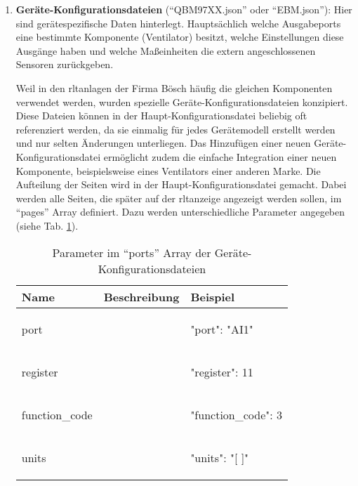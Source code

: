 \begin{enumerate}
	\item \textbf{Geräte-Konfigurationsdateien} (\zB \enquote{QBM97XX.json} oder \enquote{EBM.json}): Hier sind gerätespezifische Daten hinterlegt. Hauptsächlich welche Ausgabeports eine bestimmte Komponente (\zB Ventilator) besitzt, welche Einstellungen diese Ausgänge haben und \ggf welche Maßeinheiten die extern angeschlossenen Sensoren zurückgeben. 
	
	Weil in den \acs{rltanlagen} der Firma Bösch häufig die gleichen Komponenten verwendet werden, wurden spezielle Geräte-Konfigurationsdateien konzipiert. Diese Dateien können in der Haupt-Konfigurationsdatei beliebig oft referenziert werden, da sie einmalig für jedes Gerätemodell erstellt werden und nur selten Änderungen unterliegen. Das Hinzufügen einer neuen Geräte-Konfigurationsdatei ermöglicht zudem die einfache Integration einer neuen Komponente, beispielsweise eines Ventilators einer anderen Marke.
	Die Aufteilung der Seiten wird in der Haupt-Konfigurationsdatei gemacht. Dabei werden alle Seiten, die später auf der \acs{rltanzeige} angezeigt werden sollen, im \enquote{pages} Array definiert. Dazu werden unterschiedliche Parameter angegeben (siehe Tab. \ref{tab:pages_array_parameter}).

	
	\begin{table}[H]
		\caption{Parameter im \enquote{ports} Array der Geräte-Konfigurationsdateien}
		\label{tab:pages_array_parameter}
		\begin{tabular}{p{} p{} | p{}}
			\toprule
			\textbf{Name} & \textbf{Beschreibung} & \textbf{Beispiel} \\
			\midrule
			port      	&  & 
			\begin{jsonTable}
"port": "AI1"
			\end{jsonTable} 
			\\
			register 	&  & 
			\begin{jsonTable}
"register": 11
			\end{jsonTable} 
			\\
			function\_code 	&  & 
			\begin{jsonTable}
"function_code": 3
			\end{jsonTable} 
			\\
			units 	&  & 
			\begin{jsonTable}
"units": "[ ]"
			\end{jsonTable} 
			\\
			\bottomrule
		\end{tabular}
	\end{table}
	

\end{enumerate}
